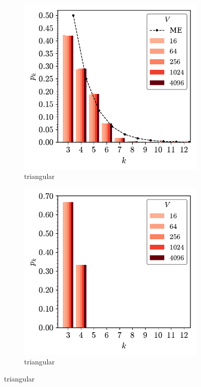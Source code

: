\begin{figure}[bt]
     \vspace{0.5cm}
     \begin{subfigure}[b]{0.40\textwidth}
         \centering
         \includegraphics[width=\textwidth]{./figures/procrystals/tri4_pk.pdf}
         \caption{triangular}
         \label{fig:pro45pkc}
     \end{subfigure}
     \hfill
      \begin{subfigure}[b]{0.40\textwidth}
         \centering
         \includegraphics[width=\textwidth]{./figures/procrystals/tri5_pk.pdf}
         \caption{triangular}
         \label{fig:pro45pkd}
     \end{subfigure}
     \hfill
    

\end{figure}

